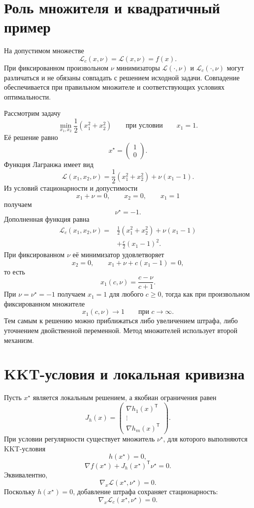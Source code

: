 \section{Роль множителя и квадратичный пример}

На допустимом множестве
\[
    \mathcal L_c(x,\nu)
    =
    \mathcal L(x,\nu)
    =
    f(x).
\]
При фиксированном произвольном \(\nu\) минимизаторы
\(\mathcal L(\cdot,\nu)\) и \(\mathcal L_c(\cdot,\nu)\) могут
различаться и не обязаны совпадать с решением исходной задачи.
Совпадение обеспечивается при правильном множителе и соответствующих
условиях оптимальности.

Рассмотрим задачу
\[
    \min_{x_1,x_2}
    \frac12(x_1^2+x_2^2)
    \qquad
    \text{при условии}
    \qquad
    x_1=1.
\]
Её решение равно
\[
    x^\star=
    \begin{pmatrix}
        1\\
        0
    \end{pmatrix}.
\]
Функция Лагранжа имеет вид
\[
    \mathcal L(x_1,x_2,\nu)
    =
    \frac12(x_1^2+x_2^2)+\nu(x_1-1).
\]
Из условий стационарности и допустимости
\[
    x_1+\nu=0,
    \qquad
    x_2=0,
    \qquad
    x_1=1
\]
получаем
\[
    \nu^\star=-1.
\]
Дополненная функция равна
\[
\begin{aligned}
    \mathcal L_c(x_1,x_2,\nu)
    ={}&
    \frac12(x_1^2+x_2^2)
    +\nu(x_1-1)
    \\
    &+
    \frac c2(x_1-1)^2.
\end{aligned}
\]
При фиксированном \(\nu\) её минимизатор удовлетворяет
\[
    x_2=0,
    \qquad
    x_1+\nu+c(x_1-1)=0,
\]
то есть
\[
    x_1(c,\nu)
    =
    \frac{c-\nu}{c+1}.
\]
При \(\nu=\nu^\star=-1\) получаем \(x_1=1\) для любого \(c\ge0\),
тогда как при произвольном фиксированном множителе
\[
    x_1(c,\nu)\to1
    \qquad
    \text{при }c\to\infty.
\]
Тем самым к решению можно приближаться либо увеличением штрафа, либо
уточнением двойственной переменной. Метод множителей использует второй
механизм.

\section{KKT-условия и локальная кривизна}

Пусть \(x^\star\) является локальным решением, а якобиан ограничения
равен
\[
    J_h(x)
    =
    \begin{pmatrix}
        \nabla h_1(x)^{\mathsf T}\\
        \vdots\\
        \nabla h_m(x)^{\mathsf T}
    \end{pmatrix}.
\]
При условии регулярности существует множитель \(\nu^\star\), для
которого выполняются KKT-условия
\[
    h(x^\star)=0,
\]
\[
    \nabla f(x^\star)
    +
    J_h(x^\star)^{\mathsf T}\nu^\star
    =0.
\]
Эквивалентно,
\[
    \nabla_x\mathcal L(x^\star,\nu^\star)=0.
\]
Поскольку \(h(x^\star)=0\), добавление штрафа сохраняет
стационарность:
\[
    \nabla_x\mathcal L_c(x^\star,\nu^\star)=0.
\]


